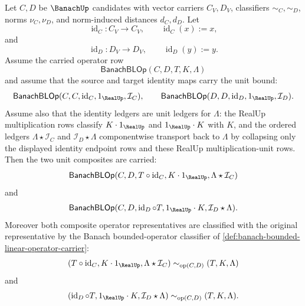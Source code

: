 \begin{theorem}
\label{thm:banach-bounded-linear-operator-identity-units}
Let $C,D$ be $\BanachUp$ candidates with vector carriers $C_V,D_V$, classifiers $\sim_C,\sim_D$, norms $\nu_C,\nu_D$, and norm-induced distances $d_C,d_D$. Let
$$
\operatorname{id}_C:C_V\to C_V,\qquad \operatorname{id}_C(x):=x,
$$
and
$$
\operatorname{id}_D:D_V\to D_V,\qquad \operatorname{id}_D(y):=y.
$$
Assume the carried operator row
$$
\mathsf{BanachBLOp}(C,D,T,K,\Lambda)
$$
and assume that the source and target identity maps carry the unit bound:
$$
\mathsf{BanachBLOp}(C,C,\operatorname{id}_C,1_{\RealUp},\mathcal{I}_C),
\qquad
\mathsf{BanachBLOp}(D,D,\operatorname{id}_D,1_{\RealUp},\mathcal{I}_D).
$$
Assume also that the identity ledgers are unit ledgers for $\Lambda$: the RealUp multiplication rows classify $K\cdot1_{\RealUp}$ and $1_{\RealUp}\cdot K$ with $K$, and the ordered ledgers $\Lambda\star\mathcal{I}_C$ and $\mathcal{I}_D\star\Lambda$ componentwise transport back to $\Lambda$ by collapsing only the displayed identity endpoint rows and these RealUp multiplication-unit rows. Then the two unit composites are carried:
$$
\mathsf{BanachBLOp}(C,D,T\circ\operatorname{id}_C,K\cdot1_{\RealUp},\Lambda\star\mathcal{I}_C)
$$
and
$$
\mathsf{BanachBLOp}(C,D,\operatorname{id}_D\circ T,1_{\RealUp}\cdot K,\mathcal{I}_D\star\Lambda).
$$
Moreover both composite operator representatives are classified with the original representative by the Banach bounded-operator classifier of \autoref{def:banach-bounded-linear-operator-carrier}:
$$
(T\circ\operatorname{id}_C,K\cdot1_{\RealUp},\Lambda\star\mathcal{I}_C)
\sim_{\mathrm{op}(C,D)}(T,K,\Lambda)
$$
and
$$
(\operatorname{id}_D\circ T,1_{\RealUp}\cdot K,\mathcal{I}_D\star\Lambda)
\sim_{\mathrm{op}(C,D)}(T,K,\Lambda).
$$
\end{theorem}
